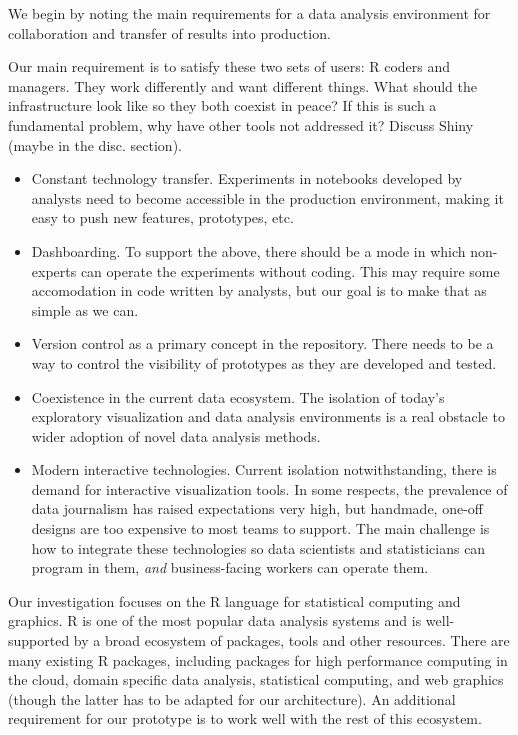 
We begin by noting the main requirements for a data analysis environment for
collaboration and transfer of results into production.

Our main requirement is to satisfy these two sets of users: R coders and
managers. They work differently and want different things. What should
the infrastructure look like so they both coexist in peace? If this is
such a fundamental problem, why have other tools not addressed it?
Discuss Shiny (maybe in the disc. section).

\begin{itemize}
\item Constant technology transfer. Experiments in notebooks developed
by analysts need to become accessible in the production environment,
making it easy to push new features, prototypes, etc.
\item Dashboarding. To support the above, there should be a mode
in which non-experts can operate the experiments without coding.
This may require some accomodation in code written by analysts,
but our goal is to make that as simple as we can.
\item Version control as a primary concept in the repository. There
needs to be a way to control the visibility of prototypes as they
are developed and tested.
\item Coexistence in the current data ecosystem. The isolation of
today's exploratory visualization and data analysis environments is
a real obstacle to wider adoption of novel data analysis methods.
\item Modern interactive technologies. Current isolation notwithstanding,
there is demand for interactive visualization tools. In some respects,
the prevalence of data journalism has raised expectations very high,
but handmade, one-off designs are too expensive to most teams to support.
The main challenge is how to integrate these technologies so data
scientists and statisticians can program in them, \emph{and} business-facing
workers can operate them.
\end{itemize}

Our investigation focuses on the R language \cite{RCoreTeam:2013:R}
for statistical computing and graphics. R is one of the most popular
data analysis systems and is well-supported by a broad ecosystem
of packages, tools and other resources.
%
There are many existing R packages, including packages for high performance
computing in the cloud, domain specific data analysis, statistical computing,
and web graphics (though the latter has to be adapted for our architecture).
An additional requirement for our prototype is to work well with the rest
of this ecosystem.
